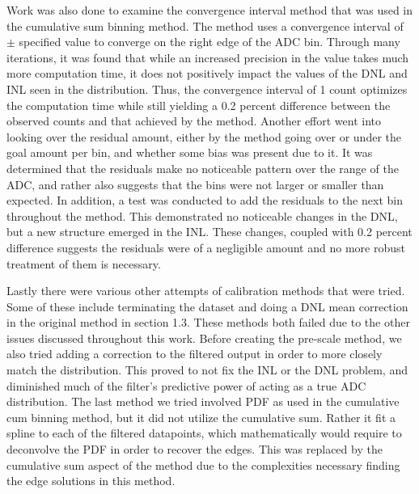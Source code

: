 \documentclass[11pt, letterpaper]{article}
\begin{document}
Work was also done to examine the convergence interval method that was used in the cumulative sum binning method. 
The method uses a convergence interval of $\pm$ specified value to converge on the right edge of the ADC bin. 
Through many iterations, it was found that while an increased precision in the value takes much more computation time, it does not positively impact the values of the DNL and INL seen in the distribution. 
Thus, the convergence interval of 1 count optimizes the computation time while still yielding a 0.2 percent difference between the observed counts and that achieved by the method. 
Another effort went into looking over the residual amount, either by the method going over or under the goal amount per bin, and whether some bias was present due to it. 
It was determined that the residuals make no noticeable pattern over the range of the ADC, and rather also suggests that the bins were not larger or smaller than expected. 
In addition, a test was conducted to add the residuals to the next bin throughout the method. 
This demonstrated no noticeable changes in the DNL, but a new structure emerged in the INL. 
These changes, coupled with 0.2 percent difference suggests the residuals were of a negligible amount and no more robust treatment of them is necessary. 
\indent 


Lastly there were various other attempts of calibration methods that were tried. 
Some of these include terminating the dataset and doing a DNL mean correction in the original method in section 1.3. 
These methods both failed due to the other issues discussed throughout this work. 
Before creating the pre-scale method, we also tried adding a correction to the filtered output in order to more closely match the distribution. 
This proved to not fix the INL or the DNL problem, and diminished much of the filter's predictive power of acting as a true ADC distribution.
The last method we tried involved PDF as used in the cumulative cum binning method, but it did not utilize the cumulative sum. 
Rather it fit a spline to each of the filtered datapoints, which mathematically would require to deconvolve the PDF in order to recover the edges. 
This was replaced by the cumulative sum aspect of the method due to the complexities necessary finding the edge solutions in this method. 
\end{document}
